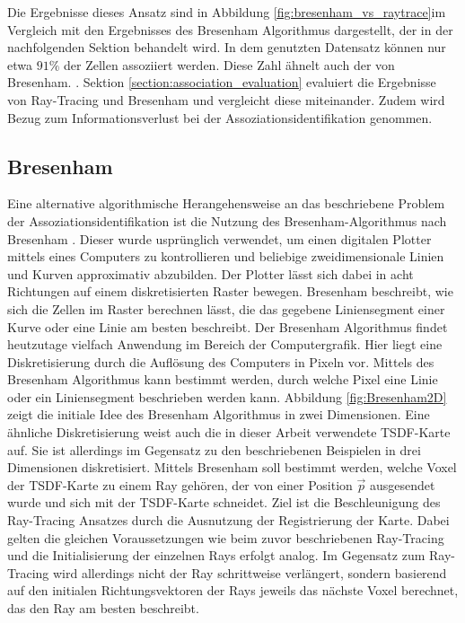 Die Ergebnisse dieses Ansatz sind in Abbildung \ref{fig:bresenham_vs_raytrace}im Vergleich mit den Ergebnisses des Bresenham Algorithmus dargestellt, der in der nachfolgenden Sektion behandelt wird. In dem genutzten Datensatz können nur etwa $91\%$ der Zellen assoziiert werden. Diese Zahl ähnelt auch der von Bresenham. . Sektion \ref{section:association_evaluation} evaluiert die Ergebnisse von Ray-Tracing und Bresenham und vergleicht diese miteinander. Zudem wird Bezug zum Informationsverlust bei der Assoziationsidentifikation genommen.




\subsection{Bresenham}

Eine alternative algorithmische Herangehensweise an das beschriebene Problem der Assoziationsidentifikation ist die Nutzung des Bresenham-Algorithmus nach Bresenham \cite{bresenham1965algorithm}. Dieser wurde usprünglich verwendet, um einen digitalen Plotter mittels eines Computers zu kontrollieren und beliebige zweidimensionale Linien und Kurven approximativ abzubilden. Der Plotter lässt sich dabei in acht Richtungen auf einem diskretisierten Raster bewegen. Bresenham \cite{bresenham1965algorithm} beschreibt, wie sich die Zellen im Raster berechnen lässt, die das gegebene Liniensegment einer Kurve oder eine Linie am besten beschreibt. Der Bresenham Algorithmus findet heutzutage vielfach Anwendung im Bereich der Computergrafik. Hier liegt eine Diskretisierung durch die Auflösung des Computers in Pixeln vor. Mittels des Bresenham Algorithmus kann bestimmt werden, durch welche Pixel eine Linie oder ein Liniensegment beschrieben werden kann. Abbildung \ref{fig:Bresenham2D} zeigt die initiale Idee des Bresenham Algorithmus in zwei Dimensionen. Eine ähnliche Diskretisierung weist auch die in dieser Arbeit verwendete TSDF-Karte auf. Sie ist allerdings im Gegensatz zu den beschriebenen Beispielen in drei Dimensionen diskretisiert. Mittels Bresenham soll bestimmt werden, welche Voxel der TSDF-Karte zu einem Ray gehören, der von einer Position $\vec{p}$ ausgesendet wurde und sich mit der TSDF-Karte schneidet. Ziel ist die Beschleunigung des Ray-Tracing Ansatzes durch die Ausnutzung der Registrierung der Karte. Dabei gelten die gleichen Voraussetzungen wie beim zuvor beschriebenen Ray-Tracing und die Initialisierung der einzelnen Rays erfolgt analog. Im Gegensatz zum Ray-Tracing wird allerdings nicht der Ray schrittweise verlängert, sondern basierend auf den initialen Richtungsvektoren der Rays jeweils das nächste Voxel berechnet, das den Ray am besten beschreibt.

